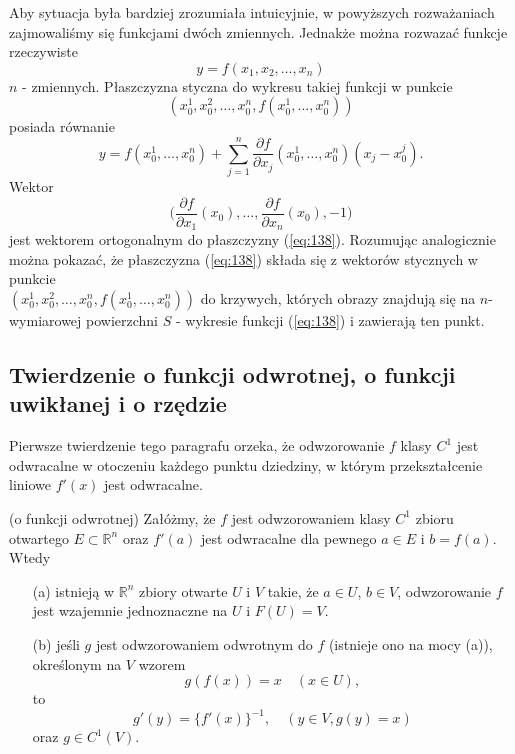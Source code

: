 \documentclass[leqno]{article}
\begin{document}
\begin{justify}
\begin{uwaga}
    Aby sytuacja była bardziej zrozumiała intuicyjnie, w powyższych rozważaniach zajmowaliśmy się funkcjami dwóch zmiennych. Jednakże można rozwazać funkcje rzeczywiste
    \begin{equation}\label{eq:137}
        y = f(x_1, x_2, \ldots, x_n)
    \end{equation}
    $n$ - zmiennych. Płaszczyzna styczna do wykresu takiej funkcji w punkcie 
    \[
        (x_0^1, x_0^2, \ldots, x_0^n, f(x_0^1, \ldots, x_0^n))
    \]
    posiada równanie 
    \begin{equation}\label{eq:138}
        y = f(x_0^1, \ldots, x_0^n) + \sum_{j=1}^{n}\frac{\partial f}{\partial x_j}(x_0^1, \ldots, x_0^n)(x_j - x_0^j).
    \end{equation}
    Wektor 
    \[
        \Big( \frac{\partial f}{\partial x_1}(x_0), \ldots, \frac{\partial f}{\partial x_n}(x_0), -1\Big)
    \]
    jest wektorem ortogonalnym do płaszczyzny (\ref{eq:138}). Rozumując analogicznie można pokazać, że płaszczyzna (\ref{eq:138}) składa się z wektorów stycznych w punkcie \\ 
    $(x_0^1, x_0^2, \ldots, x_0^n, f(x_0^1, \ldots, x_0^n))$ do krzywych, których obrazy znajdują się na $n$-wymiarowej powierzchni $S$ - wykresie funkcji (\ref{eq:138}) i zawierają ten punkt.
\end{uwaga}

\subsection{Twierdzenie o funkcji odwrotnej, o funkcji uwikłanej i o rzędzie}

Pierwsze twierdzenie tego paragrafu orzeka, że odwzorowanie $f$ klasy $C^1$ jest odwracalne w otoczeniu każdego punktu dziedziny, w którym przekształcenie liniowe $f'(x)$ jest 
odwracalne. 

\begin{theorem}
{
    (o funkcji odwrotnej) Załóżmy, że $f$ jest odwzorowaniem klasy $C^1$ zbioru otwartego $E \subset \mathbb{R}^n$ oraz $f'(a)$ jest odwracalne dla pewnego $a \in E$ i $b = f(a)$. Wtedy 
    \begin{itemize}
        \item [(a)] istnieją w $\mathbb{R}^n$ zbiory otwarte $U$ i $V$ takie, że $a \in U$, $b \in V$, odwzorowanie $f$ jest 
            wzajemnie jednoznaczne na $U$ i $F(U) = V$. 
        \item [(b)]
            jeśli $g$ jest odwzorowaniem odwrotnym do $f$ (istnieje ono na mocy (a)), określonym na $V$ wzorem 
            \[
                g(f(x)) = x \quad (x \in U),
            \]
            to 
            \[
                g'(y) = \{ f'(x)\}^{-1}, \quad (y \in V, g(y) = x)
            \]
            oraz $g \in C^1(V)$.
    \end{itemize}
}
\end{theorem}


\end{justify}
\end{document}
